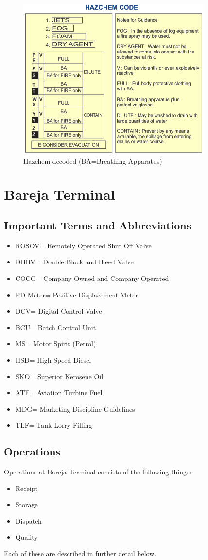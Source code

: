 \documentclass{report}
\begin{document}
	\begin{figure}[h]
		\centering
		\includegraphics[width=0.5\linewidth]{hazchem}
		\caption{Hazchem decoded (BA=Breathing Apparatus)}
		\label{hazchem}
	\end{figure}
\chapter{Bareja Terminal}
	\section{Important Terms and Abbreviations}
	\begin{itemize}
		\item ROSOV= Remotely Operated Shut Off Valve
		\item DBBV= Double Block and Bleed Valve
		\item COCO= Company Owned and Company Operated
		\item PD Meter= Positive Displacement Meter
		\item DCV= Digital Control Valve
		\item BCU= Batch Control Unit
		\item MS= Motor Spirit (Petrol)
		\item HSD= High Speed Diesel 
		\item SKO= Superior Kerosene Oil
		\item ATF= Aviation Turbine Fuel
		\item MDG= Marketing Discipline Guidelines
		\item TLF= Tank Lorry Filling
	\end{itemize}
	\section{Operations}
	Operations at Bareja Terminal consists of the following things:-
	\begin{itemize}
		\item Receipt
		\item Storage
		\item Dispatch
		\item Quality
	\end{itemize}
	Each of these are described in further detail below.
\end{document}
